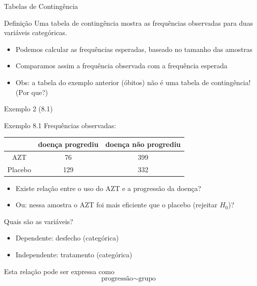 \documentclass{beamer}
\begin{document}
\begin{frame}{Tabelas de Contingência}
  \begin{block}{Definição}
    Uma \alert{tabela de contingência} mostra as frequências
    observadas para duas variáveis categóricas.
  \end{block}
  \begin{itemize}
  \item Podemos calcular as frequências esperadas, baseado no tamanho
    das amostras
  \item Comparamos assim a frequência observada com a frequência
    esperada
  \item Obs: a tabela do exemplo anterior (óbitos) \alert{não é} uma
    tabela de contingência! (Por que?)
  \end{itemize}
\end{frame}

\begin{frame}[label=exemplo8.1]{Exemplo 2 (8.1)}
  \begin{exampleblock}{Exemplo 8.1}
    Frequências observadas:
    \begin{tabular}{c|c|c}
      & doença progrediu & doença não progrediu\\
      \hline
      AZT & 76 & 399 \\
      \hline
      Placebo & 129 & 332 \\
    \end{tabular}
  \end{exampleblock}
  \begin{itemize}
  \item Existe relação entre o uso do AZT e a progressão da doença?
  \item Ou: nessa amostra o AZT foi mais eficiente que o placebo
    (rejeitar $H_0$)?
  \end{itemize}
\end{frame}

\begin{frame}{Quais são as variáveis?}
  \begin{itemize}
    \small
  \item Dependente: desfecho (categórica)
  \item Independente: tratamento (categórica)
  \end{itemize}
  \vfill
  \begin{block}{Esta relação pode ser expressa como}
    \begin{displaymath}
      \text{progressão} \sim \text{grupo}
    \end{displaymath}
  \end{block}
\end{frame}
\end{document}
